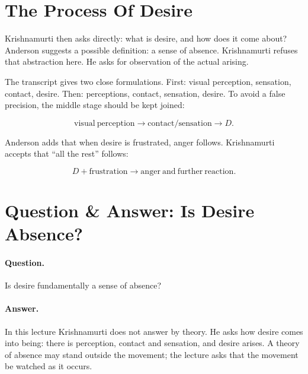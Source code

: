 \documentclass[11pt,oneside]{book}
\begin{document}
\section{The Process Of Desire}

Krishnamurti then asks directly: what is desire, and how does it come about? Anderson suggests a possible definition: a sense of absence. Krishnamurti refuses that abstraction here. He asks for observation of the actual arising.

The transcript gives two close formulations. First: visual perception, sensation, contact, desire. Then: perceptions, contact, sensation, desire. To avoid a false precision, the middle stage should be kept joined:

\begin{equation}
\mathrm{visual\ perception}
\longrightarrow
\mathrm{contact/sensation}
\longrightarrow
D.
\end{equation}

Anderson adds that when desire is frustrated, anger follows. Krishnamurti accepts that ``all the rest'' follows:

\begin{equation}
D+\mathrm{frustration}
\longrightarrow
\mathrm{anger\ and\ further\ reaction}.
\end{equation}

\section{Question \& Answer: Is Desire Absence?}

\paragraph{Question.}
Is desire fundamentally a sense of absence?

\paragraph{Answer.}
In this lecture Krishnamurti does not answer by theory. He asks how desire comes into being: there is perception, contact and sensation, and desire arises. A theory of absence may stand outside the movement; the lecture asks that the movement be watched as it occurs.
\end{document}
